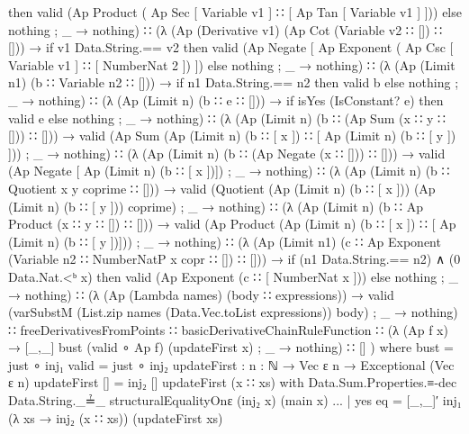 \documentclass{report}
\begin{document}
\begin{code}
{               then valid (Ap Product
                              ( Ap Sec [ Variable v1 ]
                              ∷ [ Ap Tan [ Variable v1 ] ]))
               else nothing
           ; _ → nothing})
      ∷ (λ { (Ap (Derivative v1) (Ap Cot (Variable v2 ∷ []) ∷ [])) →
             if v1 Data.String.== v2
               then valid (Ap Negate
                              [ Ap Exponent
                                   ( Ap Csc [ Variable v1 ]
                                   ∷ [ NumberNat 2 ]) ])
               else nothing
           ; _ → nothing})
      ∷ (λ { (Ap (Limit n1) (b ∷ Variable n2 ∷ [])) →
             if n1 Data.String.== n2
                then valid b
                else nothing
           ; _ → nothing})
      ∷ (λ { (Ap (Limit n) (b ∷ e ∷ [])) →
             if isYes (IsConstant? e) then valid e else nothing
           ; _ → nothing})
      ∷ (λ { (Ap (Limit n) (b ∷ (Ap Sum (x ∷ y ∷ [])) ∷ [])) →
             valid (Ap Sum (Ap (Limit n) (b ∷ [ x ]) ∷ [ Ap (Limit n) (b ∷ [ y ]) ]))
           ; _ → nothing})
      ∷ (λ { (Ap (Limit n) (b ∷ (Ap Negate (x ∷ [])) ∷ [])) →
             valid (Ap Negate [ Ap (Limit n) (b ∷ [ x ])])
           ; _ → nothing})
      ∷ (λ { (Ap (Limit n) (b ∷ Quotient x y coprime ∷ [])) →
             valid (Quotient (Ap (Limit n) (b ∷ [ x ]))
                             (Ap (Limit n) (b ∷ [ y ]))
                             coprime)
           ; _ → nothing})
      ∷ (λ { (Ap (Limit n) (b ∷ Ap Product (x ∷ y ∷ []) ∷ [])) →
             valid (Ap Product (Ap (Limit n) (b ∷ [ x ]) ∷ [ Ap (Limit n) (b ∷ [ y ])]))
           ; _ → nothing})
      ∷ (λ { (Ap (Limit n1) (c ∷ Ap Exponent (Variable n2 ∷ NumberNatP x copr ∷ []) ∷ [])) →
             if (n1 Data.String.== n2) ∧ (0 Data.Nat.<ᵇ x)
                then valid (Ap Exponent (c ∷ [ NumberNat x ]))
                else nothing
           ; _ → nothing})
      ∷ (λ { (Ap (Lambda names) (body ∷ expressions)) →
             valid (varSubstM (List.zip names (Data.Vec.toList expressions)) body)
           ; _ → nothing})
      ∷ freeDerivativesFromPoints
      ∷ basicDerivativeChainRuleFunction
      ∷ (λ { (Ap f x) → [_,_] bust (valid ∘ Ap f) (updateFirst x)
           ; _ → nothing})
      ∷ []
      )
      where
      bust = just ∘ inj₁
      valid = just ∘ inj₂
      updateFirst : {n : ℕ} → Vec ε n → Exceptional (Vec ε n)
      updateFirst [] = inj₂ []
      updateFirst (x ∷ xs) with
        Data.Sum.Properties.≡-dec
          Data.String._≟_
          structuralEqualityOnε
          (inj₂ x)
          (main x)
      ... | yes eq = [_,_]′ inj₁ (λ xs → inj₂ (x ∷ xs)) (updateFirst xs)

\end{code}
\end{document}
